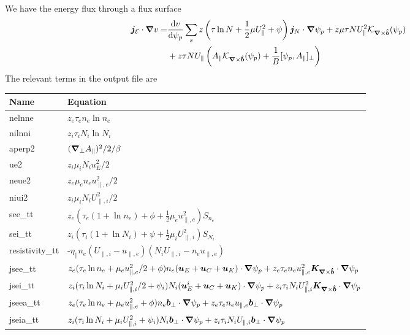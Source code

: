 We have the energy flux through a flux surface
\begin{align}
 \vec j_{\mathcal E}\cn v =&%
\frac{\d v}{\d \psi_p}\sum_s z\left (\tau\ln N + \frac{1}{2}\mu U_\parallel^2 + \psi\right) \vec j_N\cn\psi_p
+ z \mu\tau NU_\parallel^2 \mathcal K_{\vn\times\bhat}(\psi_p) \nonumber\\
&+ z \tau NU_\parallel
 \left( A_\parallel \mathcal
 K_{\vn\times\bhat}(\psi_p) + \frac{1}{B}[\psi_p, A_\parallel]_\perp\right)
\label{eq:energy_flux}
\end{align}
The relevant terms in the output file are
\begin{longtable}{ll}
\toprule
\rowcolor{gray!50}\textbf{Name} &  \textbf{Equation}\\
\midrule
    nelnne &$ z_e\tau_e n_e \ln n_e$ \\
    nilnni &$ z_i\tau_i N_i \ln N_i$ \\
    aperp2 &$ ({\boldsymbol{\nabla}}_{\perp} A_\parallel)^2/2/\beta$ \\
    ue2   &$z_i\mu_i N_i u_E^2 /2$ \\
    neue2 &$ z_e\mu_e n_e u_{\parallel,e}^2/2$ \\
    niui2 &$ z_i\mu_i N_i U_{\parallel,i}^2/2$ \\
    see\_tt & $z_e(\tau_e (1+\ln n_e) + \phi + \frac{1}{2}\mu_e u_{\parallel,e}^2) S_{n_e} $ \\
    sei\_tt & $z_i(\tau_i (1+\ln N_i) + \psi + \frac{1}{2}\mu_i U_{\parallel,i}^2) S_{N_i} $ \\
    resistivity\_tt &-$\eta_\parallel n_e (U_{\parallel,i}-u_{\parallel,e})(N_iU_{\parallel,i}-n_eu_{\parallel,e})$ \\
    jsee\_tt &$z_e(\tau_e \ln n_e + \mu_e u_{\parallel,e}^2/2 + \phi)n_e({\boldsymbol{u}}_E + {\boldsymbol{u}}_C + {\boldsymbol{u}}_K)\cdot{\boldsymbol{\nabla}} \psi_p
        + z_e \tau_e n_e u_{\parallel,e}^2 {\boldsymbol{K}}_{{\boldsymbol{\nabla}}\times\bm{\hat{b}}}\cdot{\boldsymbol{\nabla}} \psi_p$ \\
    jsei\_tt &$z_i(\tau_i \ln N_i + \mu_i U_{\parallel,i}^2/2 + \psi_i)N_i({\boldsymbol{u}}_E^i + {\boldsymbol{u}}_C + {\boldsymbol{u}}_K)\cdot{\boldsymbol{\nabla}} \psi_p
        + z_i \tau_i N_i U_{\parallel,i}^2 {\boldsymbol{K}}_{{\boldsymbol{\nabla}}\times\bm{\hat{b}}}\cdot{\boldsymbol{\nabla}} \psi_p$ \\
    jseea\_tt &$z_e(\tau_e \ln n_e + \mu_e u_{\parallel,e}^2 + \phi)n_e {\boldsymbol{ b}}_\perp\cdot{\boldsymbol{\nabla}} \psi_p
        + z_e \tau_e n_e u_{\parallel,e} {\boldsymbol{ b}}_\perp \cdot{\boldsymbol{\nabla}} \psi_p $ \\
    jseia\_tt &$z_i(\tau_i \ln N_i + \mu_i U_{\parallel,i}^2 + \psi_i)N_i {\boldsymbol{ b}}_\perp\cdot{\boldsymbol{\nabla}} \psi_p
        + z_i \tau_i N_i U_{\parallel,i} {\boldsymbol{ b}}_\perp \cdot{\boldsymbol{\nabla}} \psi_p $ \\

\end{longtable}
